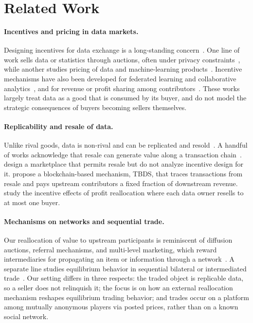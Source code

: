\section{Related Work}
\label{sec:related}

\paragraph{Incentives and pricing in data markets.}
Designing incentives for data exchange is a long-standing concern~\citep{liu2024data,azcoitia2022survey}. One line of work sells data or statistics through auctions, often under privacy constraints~\citep{ghosh2011selling,nissim2014redrawing,zhang2020selling,agarwal2024towards}, while another studies pricing of data and machine-learning products~\citep{chen2017model,chen2019towards,mi2025multi,qin2023research}. Incentive mechanisms have also been developed for federated learning and collaborative analytics~\citep{yu2020fairness,li2023martfl,han2024dynamic,zhang2025incentive}, and for revenue or profit sharing among contributors~\citep{cao2017game,bauer2024designing}. These works largely treat data as a good that is consumed by its buyer, and do not model the strategic consequences of buyers becoming sellers themselves.

\paragraph{Replicability and resale of data.}
Unlike rival goods, data is non-rival and can be replicated and resold~\citep{JonesTonetti2020NonrivalryData,shiller2013digital,ali2024reselling}. A handful of works acknowledge that resale can generate value along a transaction chain~\citep{biswas2021incentive,xin2025tbds,ma2026incentivizing}.
\citet{biswas2021incentive} design a marketplace that permits resale but do not analyze incentive design for it.
\citet{xin2025tbds} propose a blockchain-based mechanism, \textsc{TBDS}, that traces transactions from resale and pays upstream contributors a fixed fraction of downstream revenue.
\citet{ma2026incentivizing} study the incentive effects of profit reallocation where each data owner resells to at most one buyer.


\paragraph{Mechanisms on networks and sequential trade.}
Our reallocation of value to upstream participants is reminiscent of diffusion auctions, referral mechanisms, and multi-level marketing, which reward intermediaries for propagating an item or information through a network~\citep{emek2011mechanisms,li2017mechanism,li2022diffusion,zhang2020redistribution}. A separate line studies equilibrium behavior in sequential bilateral or intermediated trade~\citep{condorelli2017bilateral,manea2018intermediation,sandholm2006sequences}. Our setting differs in three respects: the traded object is replicable data, so a seller does not relinquish it; the focus is on how an external reallocation mechanism reshapes equilibrium trading behavior; and trades occur on a platform among mutually anonymous players via posted prices, rather than on a known social network.

